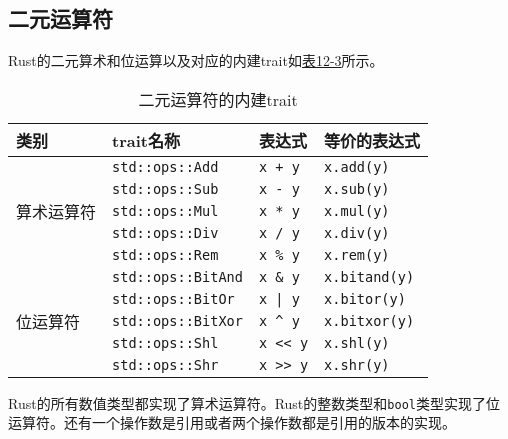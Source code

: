 \subsection{二元运算符}\label{biop}
Rust的二元算术和位运算以及对应的内建trait如\hyperref[t12-3]{表12-3}所示。

\begin{table}[htbp]
    \centering
    \caption{二元运算符的内建trait}
    \label{t12-3}
    \begin{tabular}{llll}
        \hline
        \textbf{类别}   & \textbf{trait名称}    & \textbf{表达式}   & \textbf{等价的表达式} \\
        \hline

        \multirow{5}{*}{算术运算符} & \texttt{std::ops::Add}    & \texttt{x + y}    & \texttt{x.add(y)} \\
        & \texttt{std::ops::Sub} \cellcolor{tablecolor} & \texttt{x - y} \cellcolor{tablecolor} & \texttt{x.sub(y)} \cellcolor{tablecolor}  \\
        & \texttt{std::ops::Mul}    & \texttt{x * y}    & \texttt{x.mul(y)} \\
        & \texttt{std::ops::Div} \cellcolor{tablecolor} & \texttt{x / y} \cellcolor{tablecolor} & \texttt{x.div(y)} \cellcolor{tablecolor}  \\
        & \texttt{std::ops::Rem}    & \texttt{x \% y}   & \texttt{x.rem(y)} \\

        \hline

        \multirow{5}{*}{位运算符}   & \texttt{std::ops::BitAnd} \cellcolor{tablecolor}  & \texttt{x \& y} \cellcolor{tablecolor}    & \texttt{x.bitand(y)} \cellcolor{tablecolor}   \\
        & \texttt{std::ops::BitOr}  & \texttt{x | y}    & \texttt{x.bitor(y)}   \\
        & \texttt{std::ops::BitXor} \cellcolor{tablecolor} & \texttt{x \^{} y} \cellcolor{tablecolor}   & \texttt{x.bitxor(y)} \cellcolor{tablecolor}   \\
        & \texttt{std::ops::Shl}    & \texttt{x << y}   & \texttt{x.shl(y)} \\
        & \texttt{std::ops::Shr} \cellcolor{tablecolor} & \texttt{x >> y} \cellcolor{tablecolor}    & \texttt{x.shr(y)} \cellcolor{tablecolor}  \\
    \end{tabular}
\end{table}

Rust的所有数值类型都实现了算术运算符。Rust的整数类型和\texttt{bool}类型实现了位运算符。还有一个操作数是引用或者两个操作数都是引用的版本的实现。

